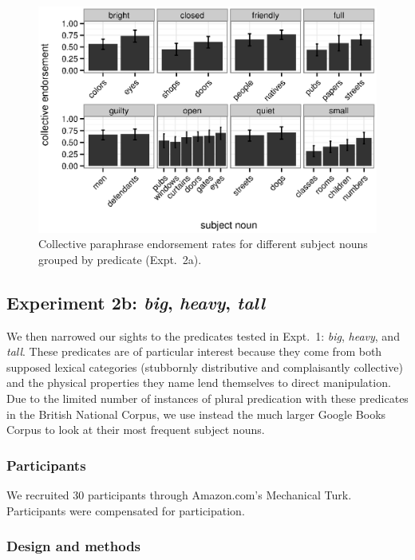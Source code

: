 \documentclass[preprint,12pt,authoryear,titlepage]{elsarticle}
\begin{document}
\begin{figure}[h!]
	\centering
	\includegraphics[width=.95\linewidth]{plots/noun_pred_plot.eps}
	\caption{Collective paraphrase endorsement rates for different subject nouns grouped by predicate (Expt.~2a).} \label{noun-pred-coll}
\end{figure}


\subsection{Experiment 2b: \emph{big}, \emph{heavy}, \emph{tall}}

We then narrowed our sights to the predicates tested in Expt.~1: \emph{big}, \emph{heavy}, and \emph{tall}. These predicates are of particular interest because they come from both supposed lexical categories (stubbornly distributive and complaisantly collective) and the physical properties they name lend themselves to direct manipulation.
Due to the limited number of instances of plural predication with these predicates in the British National Corpus, we use instead the much larger Google Books Corpus \citep{davies2011} to look at their most frequent subject nouns.

\subsubsection{Participants}

We recruited 30 participants through Amazon.com's Mechanical Turk. Participants were compensated for participation.

\subsubsection{Design and methods}
\end{document}
